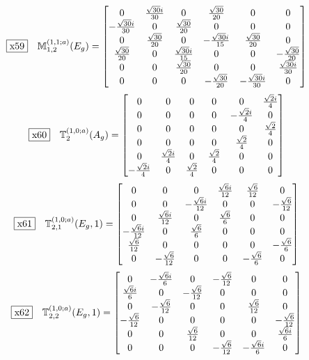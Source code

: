 \documentclass[fleqn,10pt,landscape]{jsarticle}
\begin{document}
\begin{dmath*}
\fbox{x59}\quad \mathbb{M}_{1,2}^{(1,1;a)}(E_{g})=\begin{bmatrix} 0 & \frac{\sqrt{30} i}{30} & 0 & \frac{\sqrt{30}}{20} & 0 & 0 \\ - \frac{\sqrt{30} i}{30} & 0 & \frac{\sqrt{30}}{20} & 0 & 0 & 0 \\ 0 & \frac{\sqrt{30}}{20} & 0 & - \frac{\sqrt{30} i}{15} & \frac{\sqrt{30}}{20} & 0 \\ \frac{\sqrt{30}}{20} & 0 & \frac{\sqrt{30} i}{15} & 0 & 0 & - \frac{\sqrt{30}}{20} \\ 0 & 0 & \frac{\sqrt{30}}{20} & 0 & 0 & \frac{\sqrt{30} i}{30} \\ 0 & 0 & 0 & - \frac{\sqrt{30}}{20} & - \frac{\sqrt{30} i}{30} & 0 \end{bmatrix}
\end{dmath*}
\begin{dmath*}
\fbox{x60}\quad \mathbb{T}_{2}^{(1,0;a)}(A_{g})=\begin{bmatrix} 0 & 0 & 0 & 0 & 0 & \frac{\sqrt{2} i}{4} \\ 0 & 0 & 0 & 0 & - \frac{\sqrt{2} i}{4} & 0 \\ 0 & 0 & 0 & 0 & 0 & \frac{\sqrt{2}}{4} \\ 0 & 0 & 0 & 0 & \frac{\sqrt{2}}{4} & 0 \\ 0 & \frac{\sqrt{2} i}{4} & 0 & \frac{\sqrt{2}}{4} & 0 & 0 \\ - \frac{\sqrt{2} i}{4} & 0 & \frac{\sqrt{2}}{4} & 0 & 0 & 0 \end{bmatrix}
\end{dmath*}
\begin{dmath*}
\fbox{x61}\quad \mathbb{T}_{2,1}^{(1,0;a)}(E_{g},1)=\begin{bmatrix} 0 & 0 & 0 & \frac{\sqrt{6} i}{12} & \frac{\sqrt{6}}{12} & 0 \\ 0 & 0 & - \frac{\sqrt{6} i}{12} & 0 & 0 & - \frac{\sqrt{6}}{12} \\ 0 & \frac{\sqrt{6} i}{12} & 0 & \frac{\sqrt{6}}{6} & 0 & 0 \\ - \frac{\sqrt{6} i}{12} & 0 & \frac{\sqrt{6}}{6} & 0 & 0 & 0 \\ \frac{\sqrt{6}}{12} & 0 & 0 & 0 & 0 & - \frac{\sqrt{6}}{6} \\ 0 & - \frac{\sqrt{6}}{12} & 0 & 0 & - \frac{\sqrt{6}}{6} & 0 \end{bmatrix}
\end{dmath*}
\begin{dmath*}
\fbox{x62}\quad \mathbb{T}_{2,2}^{(1,0;a)}(E_{g},1)=\begin{bmatrix} 0 & - \frac{\sqrt{6} i}{6} & 0 & - \frac{\sqrt{6}}{12} & 0 & 0 \\ \frac{\sqrt{6} i}{6} & 0 & - \frac{\sqrt{6}}{12} & 0 & 0 & 0 \\ 0 & - \frac{\sqrt{6}}{12} & 0 & 0 & \frac{\sqrt{6}}{12} & 0 \\ - \frac{\sqrt{6}}{12} & 0 & 0 & 0 & 0 & - \frac{\sqrt{6}}{12} \\ 0 & 0 & \frac{\sqrt{6}}{12} & 0 & 0 & \frac{\sqrt{6} i}{6} \\ 0 & 0 & 0 & - \frac{\sqrt{6}}{12} & - \frac{\sqrt{6} i}{6} & 0 \end{bmatrix}
\end{dmath*}
\end{document}
